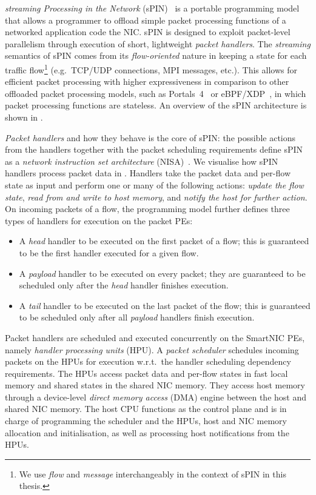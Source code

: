 \emph{streaming Processing in the Network} (sPIN)~\cite{hoefler_spin_2017} is a portable programming model that allows a programmer to offload simple packet processing functions of a networked application code the NIC.  sPIN is designed to exploit packet-level parallelism through execution of short, lightweight \textit{packet handlers}.  The \emph{streaming} semantics of sPIN comes from its \emph{flow-oriented} nature in keeping a state for each traffic flow\footnote{We use \emph{flow} and \emph{message} interchangeably in the context of sPIN in this thesis.} (e.g.\ TCP/UDP connections, MPI messages, etc.).  This allows for efficient packet processing with higher expressiveness in comparison to other offloaded packet processing models, such as Portals~4~\cite{bosshart_p4_2014} or eBPF/XDP~\cite{vieira_fast_2021}, in which packet processing functions are stateless.  An overview of the sPIN architecture is shown in .

\emph{Packet handlers} and how they behave is the core of sPIN: the possible actions from the handlers together with the packet scheduling requirements define sPIN as a \emph{network instruction set architecture} (NISA)~\cite{hoefler_spin_2017}.  We visualise how sPIN handlers process packet data in .  Handlers take the packet data and per-flow state as input and perform one or many of the following actions: \emph{update the flow state}, \emph{read from and write to host memory}, and \emph{notify the host for further action}.  On incoming packets of a flow, the programming model further defines three types of handlers for execution on the packet PEs:

\begin{itemize}
    \item A \emph{head} handler to be executed on the first packet of a flow; this is guaranteed to be the first handler executed for a given flow.
    \item A \emph{payload} handler to be executed on every packet; they are guaranteed to be scheduled only after the \emph{head} handler finishes execution.
    \item A \emph{tail} handler to be executed on the last packet of the flow; this is guaranteed to be scheduled only after all \emph{payload} handlers finish execution.
\end{itemize}

Packet handlers are scheduled and executed concurrently on the SmartNIC PEs, namely \emph{handler processing units} (HPU).  A \emph{packet scheduler} schedules incoming packets on the HPUs for execution w.r.t.\ the handler scheduling dependency requirements.  The HPUs access packet data and per-flow states in fast local memory and shared states in the shared NIC memory.  They access host memory through a device-level \emph{direct memory access} (DMA) engine between the host and shared NIC memory.  The host CPU functions as the control plane and is in charge of programming the scheduler and the HPUs, host and NIC memory allocation and initialisation, as well as processing host notifications from the HPUs.


